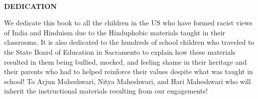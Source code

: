 \thispagestyle{empty}
~
\vfill
\begin{center}
\parbox{0.8\textwidth}{%
\centerline{\textbf{DEDICATION}}
\medskip

We dedicate this book to all the children in the US who have
formed racist views of India and Hinduism due to the Hinduphobic
materials taught in their classrooms.
It is also dedicated to the hundreds of school children who traveled
to the State Board of Education in Sacramento to explain how
these materials resulted in them being bullied, mocked, and feeling
shame in their heritage and their parents who had to helped
reinforce their values despite what was taught in school!
To Arjun Maheshwari, Nitya Maheshwari, and Hari Maheshwari
who will inherit the instructional materials resulting from our
engagements!}
\end{center}
\vfill
